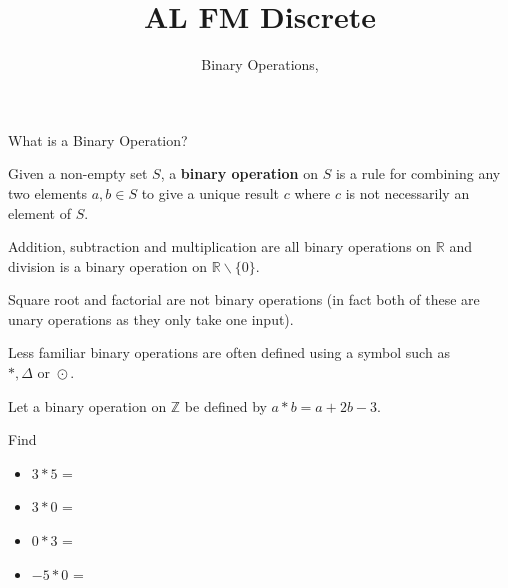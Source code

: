 \documentclass[8pt]{beamer}
\title[Pure]{{\color{aa}\Huge\adfbullet{9}}AL FM Discrete}
\subtitle{Binary Operations, \textattachfile{BinaryOperations.tex}{(TeX)}}
\begin{document}
\setlength{\abovedisplayskip}{0pt}
\setlength{\belowdisplayskip}{0pt}
\setlength{\abovedisplayshortskip}{0pt}
\setlength{\belowdisplayshortskip}{0pt}

\frame{\titlepage}

\begin{frame}{What is a Binary Operation?}
	\begin{definition}
	  Given a non-empty set $S$, a \textbf{binary operation} on $S$ is a rule for combining any two elements $a,b\in S$ to give a unique result  $c$ where  $c$ is not necessarily an element of  $S$.	
	\end{definition}

	Addition, subtraction and multiplication are all binary operations on $\mathbb{R}$ and division is a binary operation on $\mathbb{R} \backslash \{0\}$.

	Square root and factorial are not binary operations (in fact both of these are unary operations as they only take one input).

	Less familiar binary operations are often defined using a symbol such as  $*,\Delta \text{ or }\odot$.

	\begin{problem}
		Let a binary operation on $\mathbb{Z}$ be defined by $ a* b = a+2b-3$.

		Find 
		\begin{itemize}
			\item $3*5$ = 
			\item  $3*0$ = 
			\item  $0*3$ = 
			\item  $-5*0$ = 
		\end{itemize}
	\end{problem}


\end{frame}
\end{document}

